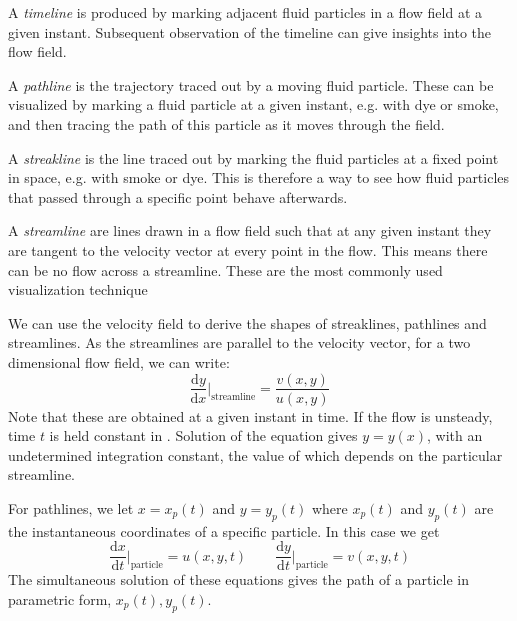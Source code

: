 \begin{definition}[Timeline]
  A \textit{timeline} is produced by marking adjacent fluid particles in a flow field at a given instant. Subsequent observation of the timeline can give insights into the flow field.
\end{definition}

\begin{definition}[Pathline]
  A \textit{pathline} is the trajectory traced out by a moving fluid particle. These can be visualized by marking a fluid particle at a given instant, e.g. with dye or smoke, and then tracing the path of this particle as it moves through the field.
\end{definition}

\begin{definition}[Streakline]
  A \textit{streakline} is the line traced out by marking the fluid particles at a fixed point in space, e.g. with smoke or dye. This is therefore a way to see how fluid particles that passed through a specific point behave afterwards.
\end{definition}

\begin{definition}[Streamlines]
  A \textit{streamline} are lines drawn in a flow field such that at any given instant they are tangent to the velocity vector at every point in the flow. This means there can be no flow across a streamline. These are the most commonly used visualization technique
\end{definition}

We can use the velocity field to derive the shapes of streaklines, pathlines and streamlines. As the streamlines are parallel to the velocity vector, for a two dimensional flow field, we can write:
\begin{equation} \label{eq:stre}
  \frac{\mathrm{d}y}{\mathrm{d}x} \bigg|_{\text{streamline}} = \frac{v(x,y)}{u(x,y)}
\end{equation}
Note that these are obtained at a given instant in time. If the flow is unsteady, time $t$ is held constant in . Solution of the equation gives $y = y(x)$, with an undetermined integration constant, the value of which depends on the particular streamline.

For pathlines, we let $x = x_p(t)$ and $y = y_p(t)$ where $x_p(t)$ and $y_p(t)$ are the instantaneous coordinates of a specific particle. In this case we get
\begin{equation} \label{eq:path}
  \frac{\mathrm{d}x}{\mathrm{d}t} \bigg|_{\text{particle}} = u(x,y,t) \qquad \frac{\mathrm{d}y}{\mathrm{d}t} \bigg|_{\text{particle}} = v(x,y,t)
\end{equation}
The simultaneous solution of these equations gives the path of a particle in parametric form, $x_p(t), y_p(t)$.

